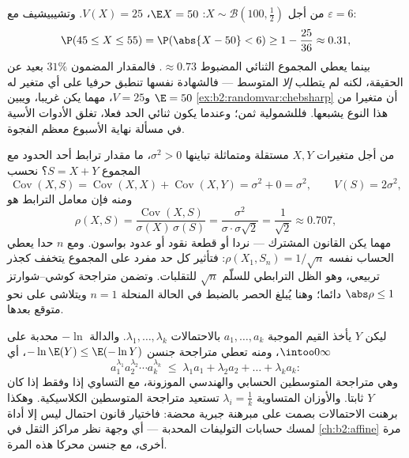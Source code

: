 \begin{example}\label{ex:b2:randomvar:hundredtosses}
من أجل $X \sim \mathcal B(100, \frac12)$: $\E X = 50$، $V(X) =
25$. وتشيبيشيف مع $\varepsilon = 6$:
\[
\P(45 \leq X \leq 55) = \P(\abs{X - 50} < 6)
\geq 1 - \frac{25}{36} \approx 0.31 ,
\]
بينما يعطي المجموع الثنائي المضبوط $\approx 0.73$. فالمقدار المضمون $31\%$
بعيد عن الحقيقة، لكنه لم يتطلب \emph{إلا} المتوسط  ---
فالشهادة نفسها تنطبق حرفيا على أي متغير له $\E = 50$ و$V = 25$، مهما
يكن غريبا، ويبين \cref{ex:b2:randomvar:chebsharp} أن متغيرا من هذا النوع يشبعها. فللشمولية
ثمن؛ وعندما يكون  ثنائي الحد فعلا، تغلق الأدوات الأسية في
مسألة نهاية الأسبوع معظم الفجوة.
\end{example}

\begin{example}\label{ex:b2:randomvar:partwhole}
من أجل متغيرات $X, Y$ مستقلة ومتماثلة  تباينها $\sigma^2 > 0$، ما
مقدار ترابط أحد الحدود مع المجموع $S = X + Y$؟ نحسب
\[
\operatorname{Cov}(X, S) = \operatorname{Cov}(X, X) +
\operatorname{Cov}(X, Y) = \sigma^2 + 0 = \sigma^2,
\qquad V(S) = 2\sigma^2,
\]
ومنه فإن معامل الترابط هو
\[
\rho(X, S) = \frac{\operatorname{Cov}(X,
S)}{\sigma(X)\,\sigma(S)}
= \frac{\sigma^2}{\sigma\cdot\sigma\sqrt2}
= \frac{1}{\sqrt2} \approx 0.707 ,
\]
مهما يكن القانون المشترك --- نردا أو قطعة نقود أو عدود بواسون. ومع
$n$ حدا يعطي الحساب نفسه $\rho(X_1, S_n) =
1/\sqrt n$: فتأثير كل حد مفرد على المجموع
يتخفف كجذر تربيعي، وهو الظل الترابطي للسلّم $\sqrt n$ للتقلبات. وتضمن
متراجحة كوشي--شوارتز $\abs\rho \leq 1$ دائما؛ وهنا يُبلغ الحصر بالضبط في الحالة
المنحلة $n = 1$ ويتلاشى على نحو متوقع بعدها.
\end{example}

\begin{example}\label{ex:b2:randomvar:amgm}
ليكن $Y$ يأخذ القيم الموجبة $a_1, \dots, a_k$ بالاحتمالات $\lambda_1, \dots, \lambda_k$. والدالة
$-\ln$ محدبة على $\intoo0\infty$، ومنه تعطي متراجحة جنسن $-\ln\E(Y) \leq \E(-\ln Y)$، أي
\[
a_1^{\lambda_1}a_2^{\lambda_2}\cdots a_k^{\lambda_k}
\;\leq\; \lambda_1a_1 + \lambda_2a_2 + \dots + \lambda_ka_k :
\]
وهي متراجحة المتوسطين الحسابي والهندسي الموزونة، مع التساوي إذا وفقط
إذا كان $Y$ ثابتا. والأوزان المتساوية $\lambda_i = \frac1k$ تستعيد متراجحة
المتوسطين الكلاسيكية. وهكذا برهنت الاحتمالات بصمت على مبرهنة جبرية
محضة: فاختيار قانون احتمال ليس إلا أداة لمسك حسابات التوليفات
المحدبة --- أي وجهة نظر مراكز الثقل في \cref{ch:b2:affine} مرة أخرى، مع جنسن
محركا هذه المرة.
\end{example}

